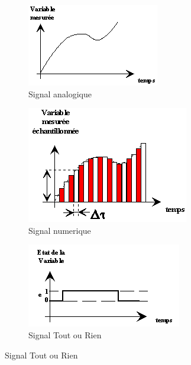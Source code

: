 \documentclass[10pt,fleqn]{article} %
\begin{document}
\begin{figure}[ht]
  \begin{subfigure}{.33\textwidth}
    \includegraphics[width=\textwidth]{images/analogique}
    \caption{Signal analogique}
    \centering
    \label{fig:analogique}
  \end{subfigure}
  \begin{subfigure}{.33\textwidth}
    \centering
    \includegraphics[width=\textwidth]{images/numerique}
    \caption{Signal numerique}
    \label{fig:numeique}
  \end{subfigure}
  \begin{subfigure}{.33\textwidth}
    \centering
    \includegraphics[width=\textwidth]{images/tor}
    \caption{Signal Tout ou Rien}
    \label{fig:tor}
  \end{subfigure}
\end{figure}
\end{document}
